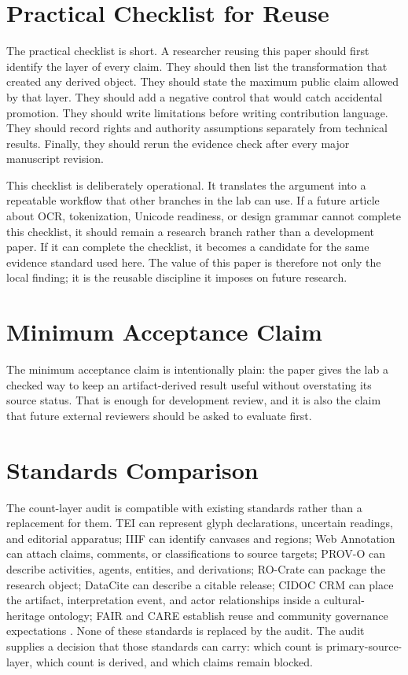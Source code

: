 \documentclass[sigconf,nonacm]{acmart}
\begin{document}
\section{Practical Checklist for Reuse}
The practical checklist is short. A researcher reusing this paper should first
identify the layer of every claim. They should then list the transformation that
created any derived object. They should state the maximum public claim allowed
by that layer. They should add a negative control that would catch accidental
promotion. They should write limitations before writing contribution language.
They should record rights and authority assumptions separately from technical
results. Finally, they should rerun the evidence check after every major
manuscript revision.

This checklist is deliberately operational. It translates the argument into a
repeatable workflow that other branches in the lab can use. If a future article
about OCR, tokenization, Unicode readiness, or design grammar cannot complete
this checklist, it should remain a research branch rather than a development
paper. If it can complete the checklist, it becomes a candidate for the same
evidence standard used here. The value of this paper is therefore not
only the local finding; it is the reusable discipline it imposes on future
research.

\section{Minimum Acceptance Claim}
The minimum acceptance claim is intentionally plain: the paper gives the lab a
checked way to keep an artifact-derived result useful without overstating its
source status. That is enough for development review, and it is also the claim
that future external reviewers should be asked to evaluate first.



\section{Standards Comparison}
The count-layer audit is compatible with existing standards rather than a
replacement for them. TEI can represent glyph declarations, uncertain readings,
and editorial apparatus; IIIF can identify canvases and regions; Web Annotation
can attach claims, comments, or classifications to source targets; PROV-O can
describe activities, agents, entities, and derivations; RO-Crate can package the
research object; DataCite can describe a citable release; CIDOC CRM can place
the artifact, interpretation event, and actor relationships inside a
cultural-heritage ontology; FAIR and CARE establish reuse and community
governance expectations \cite{azuonye1992,omniglotNwagu,unicodeAfricanScripts2023,scriptSourceNwagu,sirisNwaguProposal,teiP5Glyphs,iiifPresentation3,w3cAnnotationModel,w3cAnnotationVocab,w3cProvO,rocrate12,cidocCrm,datacite45,wilkinson2016fair,carroll2020care,wadden2020scifact,gao2023alce,karpathyAutoresearch,acmSubmissions,arxivSubmitTex}. None of these standards is
replaced by the audit. The audit supplies a decision that those standards can
carry: which count is primary-source-layer, which count is derived, and which
claims remain blocked.
\end{document}
